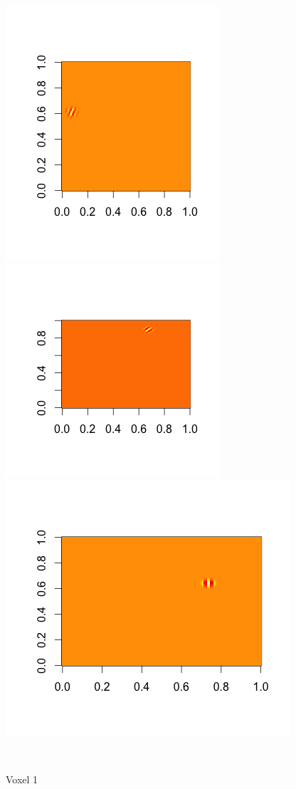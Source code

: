 \documentclass[english]{amsart}
\begin{document}
\begin{figure}[H]
  \includegraphics[width=\linewidth, height = 150pts]{voxel1_wave.png}
\endminipage\hfill
\vspace{-5mm}
  \includegraphics[width=\linewidth, height = 150pts]{voxel1_wave1.png}
\endminipage\hfill
{}
  \includegraphics[width=\linewidth, height = 150pts]{voxel1_wave2.png}
\endminipage
  \caption{Voxel 1}\
\end{figure}
\vspace{-10mm}
\end{document}
